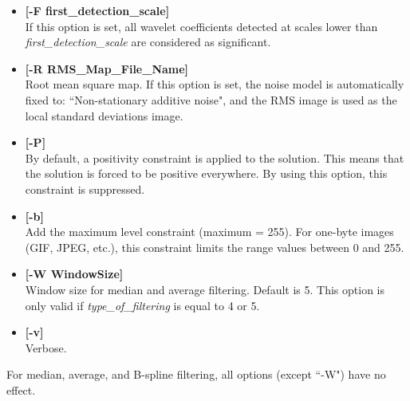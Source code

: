 \begin{itemize}
\begin{itemize}
\item {\bf [-F first\_detection\_scale]} \\
If this option is set, all wavelet coefficients detected at scales lower 
than {\em first\_detection\_scale} are considered as significant.
\item {\bf [-R RMS\_Map\_File\_Name]} \\
Root mean square map. If this option is set, the noise model is 
automatically fixed to: ``Non-stationary additive noise", 
and the RMS image is used as the local standard deviations image.
\item {\bf [-P]} \\
 By default, a positivity constraint is applied to the solution. This means
 that the solution is forced to be positive everywhere. By using this option,
 this constraint is suppressed.
 \item {\bf [-b]} \\
Add the maximum level constraint (maximum = 255). For one-byte images
(GIF, JPEG, etc.), this constraint limits the range values between 0 and 255.
\item {\bf [-W WindowSize]} \\
Window size for median and average filtering. Default is 5. This option is
only valid if {\em type\_of\_filtering} is equal to 4 or 5.
\item {\bf [-v]} \\
Verbose.
\end{itemize}

\noindent
For median, average, and B-spline filtering, all options (except ``-W")
have no effect.


\end{itemize}
